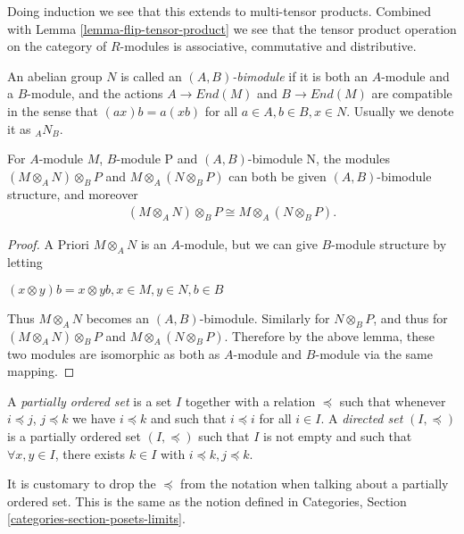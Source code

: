\noindent
Doing induction we see that this extends to multi-tensor products. Combined
with Lemma \ref{lemma-flip-tensor-product} we see that
the tensor product operation on the category of $R$-modules is associative,
commutative and distributive.

\begin{definition}
\label{definition-bimodule}
An abelian group $N$ is called an {\it $(A, B)$-bimodule} if it is both an
$A$-module and a $B$-module, and
the actions $A\rightarrow End(M)$ and $B\rightarrow End(M)$
are compatible in the sense that $(ax)b = a(xb)$ for all
$a\in A, b\in B, x\in N$. Usually we denote it as $_{A}N_{B}$.
\end{definition}

\begin{lemma}
\label{lemma-tensor-with-bimodule}
For $A$-module $M$, $B$-module P and $(A, B)$-bimodule N, the modules
$(M\otimes_{A}N)\otimes_{B}P$ and $M\otimes_{A}(N\otimes_{B}P)$ can both be
given $(A, B)$-bimodule structure,
and moreover
\begin{align}
(M\otimes_{A}N)\otimes_{B}P \cong M\otimes_{A}(N\otimes_{B}P).
\end{align}
\end{lemma}

\begin{proof}
A Priori $M\otimes_A N$ is an $A$-module, but we can give $B$-module structure
by letting
\begin{center}
$(x\otimes y)b = x\otimes yb, x\in M, y\in N, b\in B$
\end{center}
Thus $M\otimes_A N$ becomes an $(A, B)$-bimodule. Similarly for $N\otimes_B P$,
and thus for
$(M\otimes_{A}N)\otimes_{B}P$ and $M\otimes_{A}(N\otimes_{B}P)$. Therefore by
the above lemma, these two
modules are isomorphic as both as $A$-module and $B$-module via the same
mapping.
\end{proof}

\begin{definition}
\label{definition-directed-set}
A {\it partially ordered set} is a set $I$ together with a relation
$\preceq$ such that whenever $i \preceq j$, $j \preceq k$
we have $i \preceq k$ and such that $i \preceq i$ for all $i \in I$.
A {\it directed set} $(I, \preceq)$
is a partially ordered set $(I, \preceq)$ such that
$I$ is not empty and such that $\forall x, y\in I$,
there exists $k\in I$ with $i\preceq k, j\preceq k$.
\end{definition}

\noindent
It is customary to drop the $\preceq$ from the notation when talking
about a partially ordered set.
This is the same as the notion defined in Categories,
Section \ref{categories-section-posets-limits}.


